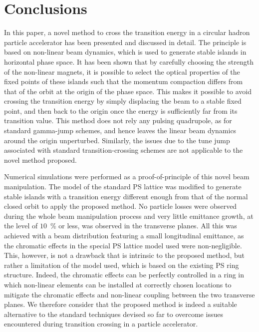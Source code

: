 \documentclass{article}
\begin{document}
\section{Conclusions}\label{sec:conclusions}
%
In this paper, a novel method to cross the transition energy in a circular hadron particle accelerator has been presented and discussed in detail. The principle is based on non-linear beam dynamics, which is used to generate stable islands in horizontal phase space. It has been shown that by carefully choosing the strength of the non-linear magnets, it is possible to select the optical properties of the fixed points of these islands such that the momentum compaction differs from that of the orbit at the origin of the phase space. This makes it possible to avoid crossing the transition energy by simply displacing the beam to a stable fixed point, and then back to the origin once the energy is sufficiently far from its transition value. This method does not rely any pulsing quadrupole, as for standard gamma-jump schemes, and hence leaves the linear beam dynamics around the origin unperturbed. Similarly, the issues due to the tune jump associated with standard transition-crossing schemes are not applicable to the novel method proposed.

Numerical simulations were performed as a proof-of-principle of this novel beam manipulation. The model of the standard PS lattice was modified to generate stable islands with a transition energy different enough from that of the normal closed orbit to apply the proposed method. No particle losses were observed during the whole beam manipulation process and very little emittance growth, at the level of $10$~\% or less, was observed in the transverse planes. All this was achieved with a beam distribution featuring a small longitudinal emittance, as the chromatic effects in the special PS lattice model used were non-negligible. This, however, is not a drawback that is intrinsic to the proposed method, but rather a limitation of the model used, which is based on the existing PS ring structure. Indeed, the chromatic effects can be perfectly controlled in a ring in which non-linear elements can be installed at correctly chosen locations to mitigate the chromatic effects and non-linear coupling between the two transverse planes. We therefore consider that the proposed method is indeed a suitable alternative to the standard techniques devised so far to overcome issues encountered during transition crossing in a particle accelerator.
%
\end{document}
